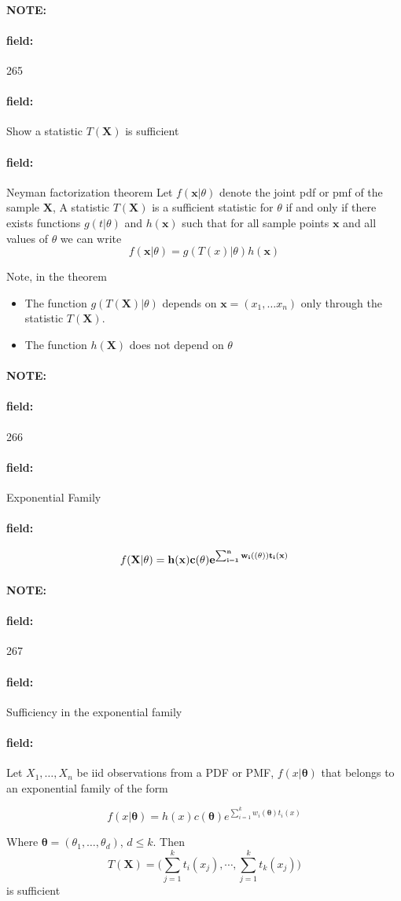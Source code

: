 \documentclass[12pt]{article}
\newenvironment{note}{\paragraph{NOTE:}}{}
\newenvironment{field}{\paragraph{field:}}{}
\begin{document}
\begin{note} \begin{field} \tiny 265 \end{field}
  \begin{field}
    Show a statistic $T(\mathbf{X})$ is sufficient
  \end{field}
  \begin{field}
    Neyman factorization theorem
    Let $f(\mathbf{x}|\theta)$ denote the joint pdf or pmf of the sample $\mathbf{X}$, A statistic $T(\mathbf{X})$ is a sufficient statistic for $\theta$ if and only if there exists functions $g(t|\theta)$ and $h(\mathbf{x})$ such that for all sample points $\mathbf{x}$ and all values of $\theta$ we can write
    $$ f(\mathbf{x}|\theta) = g(T(\mathbf{}x)|\theta)h(\mathbf{x})$$

    Note, in the theorem
    \begin{itemize}
      \item The function $g(T(\mathbf{X})|\theta)$ depends on $\mathbf{x} = (x_1, \ldots x_n)$ only through the statistic $T(\mathbf{X})$.
      \item The function $h(\mathbf{X})$ does not depend on $\theta$
    \end{itemize}
  \end{field}
\end{note}

\begin{note} \begin{field} \tiny 266 \end{field}
  \begin{field}
    Exponential Family
  \end{field}
  \begin{field}
    $$f(\mathbf{X}|\bf{\theta}) = h(\mathbf{x})c(\mathbf{\theta})e^{\sum _{i = 1}^n w_i(\bf(\theta))t_i(x)}$$
  \end{field}
\end{note}




\begin{note} \begin{field} \tiny 267 \end{field}
  \begin{field}
    Sufficiency in the exponential family
  \end{field}
  \begin{field}
    Let $X_1, \ldots , X_n$ be iid observations from a PDF or PMF, $f(x|\boldsymbol\theta)$ that belongs to an exponential family of the form

    $$ f(x|\boldsymbol\theta) = h(x)c(\boldsymbol\theta)e^{\sum _{i = 1}^k w_i(\boldsymbol\theta)t_i(x)}$$

    Where $\boldsymbol\theta = (\theta_1, \ldots, \theta_d)$, $d\leq k$. Then
    $$ T(\mathbf{X}) = \big(\sum _{j = 1}^k t_i(x_j), \cdots , \sum _{j = 1}^k t_k(x_j)\big)$$
    is sufficient
  \end{field}
\end{note}
\end{document}
